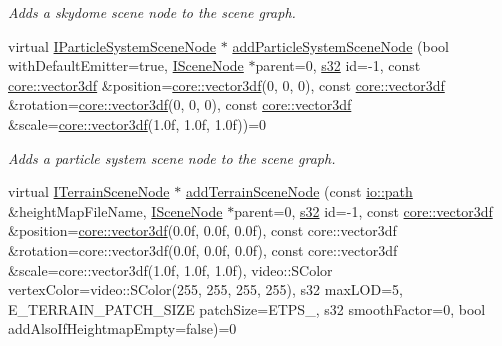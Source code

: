 \begin{DoxyCompactItemize}
\begin{DoxyCompactList}\small\item\em Adds a skydome scene node to the scene graph. \end{DoxyCompactList}\item 
virtual \hyperlink{classirr_1_1scene_1_1IParticleSystemSceneNode}{I\+Particle\+System\+Scene\+Node} $\ast$ \hyperlink{classirr_1_1scene_1_1ISceneManager_a1c1c2b024a01bd1d6d56518926e37fa8}{add\+Particle\+System\+Scene\+Node} (bool with\+Default\+Emitter=true, \hyperlink{classirr_1_1scene_1_1ISceneNode}{I\+Scene\+Node} $\ast$parent=0, \hyperlink{namespaceirr_ac66849b7a6ed16e30ebede579f9b47c6}{s32} id=-\/1, const \hyperlink{namespaceirr_1_1core_a06f169d08b5c429f5575acb7edbad811}{core\+::vector3df} \&position=\hyperlink{namespaceirr_1_1core_a06f169d08b5c429f5575acb7edbad811}{core\+::vector3df}(0, 0, 0), const \hyperlink{namespaceirr_1_1core_a06f169d08b5c429f5575acb7edbad811}{core\+::vector3df} \&rotation=\hyperlink{namespaceirr_1_1core_a06f169d08b5c429f5575acb7edbad811}{core\+::vector3df}(0, 0, 0), const \hyperlink{namespaceirr_1_1core_a06f169d08b5c429f5575acb7edbad811}{core\+::vector3df} \&scale=\hyperlink{namespaceirr_1_1core_a06f169d08b5c429f5575acb7edbad811}{core\+::vector3df}(1.\+0f, 1.\+0f, 1.\+0f))=0
\begin{DoxyCompactList}\small\item\em Adds a particle system scene node to the scene graph. \end{DoxyCompactList}\item 
virtual \hyperlink{classirr_1_1scene_1_1ITerrainSceneNode}{I\+Terrain\+Scene\+Node} $\ast$ \hyperlink{classirr_1_1scene_1_1ISceneManager_a2188fb0443c7e0b6b69a673ca1d9ca5c}{add\+Terrain\+Scene\+Node} (const \hyperlink{namespaceirr_1_1io_ab1bdc45edb3f94d8319c02bc0f840ee1}{io\+::path} \&height\+Map\+File\+Name, \hyperlink{classirr_1_1scene_1_1ISceneNode}{I\+Scene\+Node} $\ast$parent=0, \hyperlink{namespaceirr_ac66849b7a6ed16e30ebede579f9b47c6}{s32} id=-\/1, const \hyperlink{namespaceirr_1_1core_a06f169d08b5c429f5575acb7edbad811}{core\+::vector3df} \&position=\hyperlink{namespaceirr_1_1core_a06f169d08b5c429f5575acb7edbad811}{core\+::vector3df}(0.\+0f, 0.\+0f, 0.\+0f), const core\+::vector3df \&rotation=core\+::vector3df(0.\+0f, 0.\+0f, 0.\+0f), const core\+::vector3df \&scale=core\+::vector3df(1.\+0f, 1.\+0f, 1.\+0f), video\+::\+S\+Color vertex\+Color=video\+::\+S\+Color(255, 255, 255, 255), s32 max\+L\+O\+D=5, E\+\_\+\+T\+E\+R\+R\+A\+I\+N\+\_\+\+P\+A\+T\+C\+H\+\_\+\+S\+I\+Z\+E patch\+Size=\+E\+T\+P\+S\+\_, s32 smooth\+Factor=0, bool add\+Also\+If\+Heightmap\+Empty=false)=0

\end{DoxyCompactItemize}
